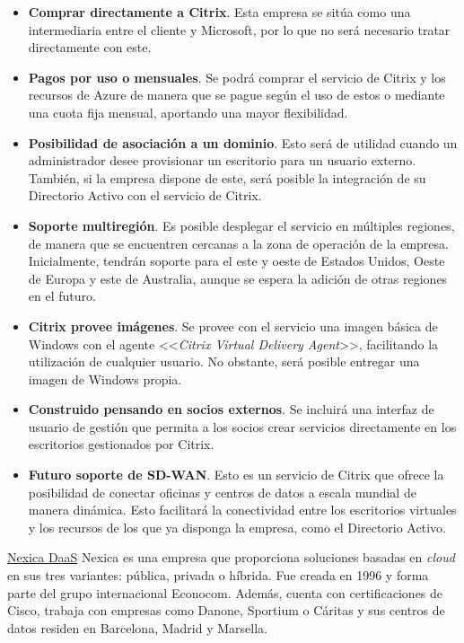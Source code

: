\begin{itemize}
    \item \textbf{Comprar directamente a Citrix}. Esta empresa se sitúa como una intermediaria entre el cliente y Microsoft, por lo que no será necesario tratar directamente con este.
    
    \item \textbf{Pagos por uso o mensuales}. Se podrá comprar el servicio de Citrix y los recursos de Azure de manera que se pague según el uso de estos o mediante una cuota fija mensual, aportando una mayor flexibilidad.
    
    \item \textbf{Posibilidad de asociación a un dominio}. Esto será de utilidad cuando un administrador desee provisionar un escritorio para un usuario externo. También, si la empresa dispone de este, será posible la integración de su Directorio Activo con el servicio de Citrix.
    
    \item \textbf{Soporte multiregión}. Es posible desplegar el servicio en múltiples regiones, de manera que se encuentren cercanas a la zona de operación de la empresa. Inicialmente, tendrán soporte para el este y oeste de Estados Unidos, Oeste de Europa y este de Australia, aunque se espera la adición de otras regiones en el futuro.
    
    \item \textbf{Citrix provee imágenes}. Se provee con el servicio una imagen básica de Windows con el agente <<\textit{Citrix Virtual Delivery Agent}>>, facilitando la utilización de cualquier usuario. No obstante, será posible entregar una imagen de Windows propia.
    
    \item \textbf{Construido pensando en socios externos}. Se incluirá una interfaz de usuario de gestión que permita a los socios crear servicios directamente en los escritorios gestionados por Citrix.
    
    \item \textbf{Futuro soporte de \acf{SD-WAN}}. Esto es un servicio de Citrix que ofrece la posibilidad de conectar oficinas y centros de datos a escala mundial de manera dinámica. Esto facilitará la conectividad entre los escritorios virtuales y los recursos de los que ya disponga la empresa, como el Directorio Activo.
\end{itemize}

\clearpage

\noindent\underline{Nexica \acs{DaaS}}\newline
\indent Nexica \cite{nexicaabout} es una empresa que proporciona soluciones basadas en \textit{cloud} en sus tres variantes: pública, privada o híbrida. Fue creada en 1996 y forma parte del grupo internacional Econocom. Además, cuenta con certificaciones de Cisco, trabaja con empresas como Danone, Sportium o Cáritas y sus centros de datos residen en Barcelona, Madrid y Marsella.

